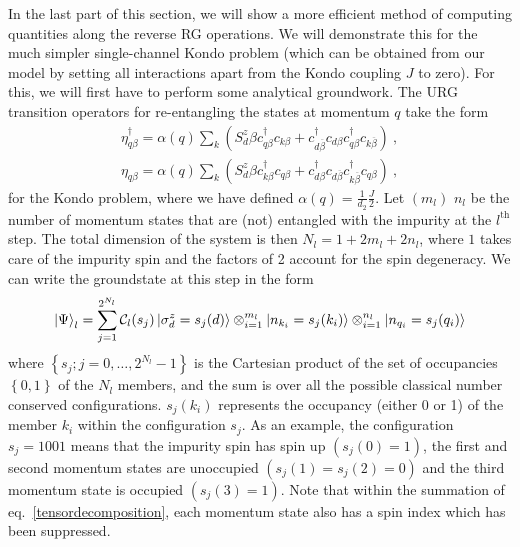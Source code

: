 In the last part of this section, we will show a more efficient method of computing quantities along the reverse RG operations. We will demonstrate this for the much simpler single-channel Kondo problem (which can be obtained from our model by setting all interactions apart from the Kondo coupling \(J\) to zero). For this, we will first have to perform some analytical groundwork. The URG transition operators for re-entangling the states at momentum \(q\) take the form
\begin{equation}\begin{aligned}
	\eta_{q\beta}^\dagger = \alpha(q)\sum_{k} \left( S_d^z \beta c^\dagger_{q\beta}c_{k\beta} + c^\dagger_{d\overline\beta}c_{d\beta}c^\dagger_{q\beta}c_{k\overline\beta}\right) ~,\\
	\eta_{q\beta} = \alpha(q)\sum_{k} \left( S_d^z \beta c^\dagger_{k\beta}c_{q\beta} + c^\dagger_{d\beta}c_{d\overline\beta}c^\dagger_{k\overline\beta}c_{q\beta}\right)~,
\end{aligned}\end{equation}
for the Kondo problem, where we have defined \(\alpha(q) = \frac{1}{d_2}\frac{J}{2}\). Let \((m_l)\) \(n_l\) be the number of momentum states that are (not) entangled with the impurity at the \(l^\text{th}\) step. The total dimension of the system is then \(N_l = 1 + 2m_l + 2n_l\), where \(1\) takes care of the impurity spin and the factors of 2 account for the spin degeneracy. We can write the groundstate at this step in the form
\begin{equation}\begin{aligned}
	\ket{\Psi}_l = \sum_{j=1}^{2^{N_l}} \mathcal{C}_l(s_j)\ket{\sigma^z_d=s_j(d)}\otimes_{i=1}^{m_l}\ket{n_{k_i}=s_j(k_i) }\otimes_{i=1}^{n_l}\ket{n_{q_i}=s_j(q_i)}\label{tensordecomposition}
\end{aligned}\end{equation}
where \(\left\{ s_j; j=0,\ldots,2^{N_l}-1\right\} \) is the Cartesian product of the set of occupancies \(\left\{ 0,1 \right\} \) of the \(N_l\) members, and the sum is over all the possible classical number conserved configurations. \(s_j(k_i)\) represents the occupancy (either 0 or 1) of the member \(k_i\) within the configuration \(s_j\). As an example, the configuration \(s_j = 1001\) means that the impurity spin has spin up \(\left( s_j(0) = 1 \right) \), the first and second momentum states are unoccupied \(\left( s_j(1) = s_j(2) = 0 \right) \) and the third momentum state is occupied \(\left( s_j(3) = 1 \right) \). Note that within the summation of eq.~\ref{tensordecomposition}, each momentum state also has a spin index which has been suppressed.

